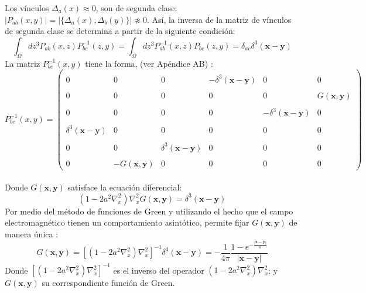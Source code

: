 \documentclass[a4paper,12pt]{article}
\begin{document}
Los vínculos $\Delta_a(x)\approx0$, son de segunda clase: \mbox{$|P_{ab}(x,y)|=|\{\Delta_a(x),\Delta_b(y)\}|\not\approx0$}. Así, la inversa de la matriz de vínculos de segunda clase se determina a partir de la siguiente condición:
\begin{equation}
\int_\Omega dz^3P_{ab}(x,z)P_{bc}^{-1}(z,y)=\int_\Omega dz^3P_{ab}^{-1}(x,z)P_{bc}(z,y)=\delta_{ac}\delta^3(\textbf{x}-\textbf{y})
\end{equation}
La matriz $P_{bc}^{-1}(x,y)$ tiene la forma, (ver Apéndice AB) \cite{podolsky}:
{\scriptsize
\begin{equation}
P_{bc}^{-1}(x,y)=\left(\begin{matrix}
 \\ 0& 0 & 0 &-\delta^3(\textbf{x}-\textbf{y}) & 0 & 0  \\
 \\ 0& 0 & 0 &  0 & 0 &G(\textbf{x},\textbf{y})\\ 
\\ 0& 0 & 0 &  0 & -\delta^3(\textbf{x}-\textbf{y}) &0\\
\\ \delta^3(\textbf{x}-\textbf{y}) & 0 & 0 & 0 & 0 & 0 \\
\\0 & 0 & \delta^3(\textbf{x}-\textbf{y})& 0 & 0 & 0  \\
\\0 & -G(\textbf{x},\textbf{y}) & 0& 0 & 0 & 0 
\end{matrix}\right)
\end{equation} }\\
Donde $G(\textbf{x},\textbf{y})$ satisface la ecuación diferencial:
\begin{equation}
(1-2a^2\nabla^2_x)\nabla^2_xG(\textbf{x},\textbf{y})=\delta^3(\textbf{x}-\textbf{y})
\end{equation}
Por medio del método de funciones de Green y utilizando el hecho que el campo electromagnético tienen un comportamiento asintótico, permite fijar $G(\textbf{x},\textbf{y})$ de manera única \cite{podolsky}: 
\begin{equation}
G(\textbf{x},\textbf{y})=[(1-2a^2\nabla^2_x)\nabla^2_x]^{-1}\delta^3(\textbf{x}-\textbf{y})=-\frac{1}{4\pi}\frac{1-e^{-\frac{|\textbf{x}-\textbf{y}|}{a}}}{|\textbf{x}-\textbf{y}|} 
\end{equation} 
Donde $[(1-2a^2\nabla^2_x)\nabla^2_x]^{-1}$ es el inverso del operador $(1-2a^2\nabla^2_x)\nabla^2_x$; y $G(\textbf{x},\textbf{y})$ su correspondiente función de Green.
\\
\end{document}
